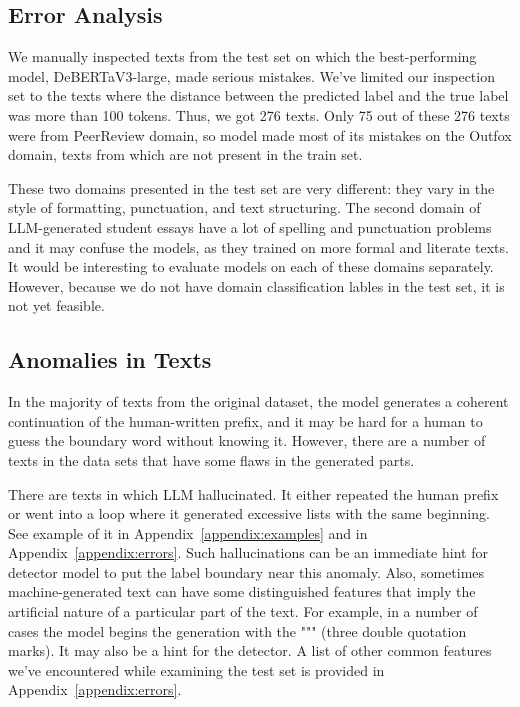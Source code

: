\documentclass[11pt]{article}
\begin{document}
\subsection{Error Analysis}

 We manually inspected texts from the test set on which the best-performing model, DeBERTaV3-large, made serious mistakes. We've limited our inspection set to the texts where the distance between the predicted label and the true label was more than 100 tokens. Thus, we got 276 texts. Only 75 out of these 276 texts were from PeerReview domain, so model made most of its mistakes on the Outfox domain, texts from which are not present in the train set.
 
 These two domains presented in the test set are very different: they vary in the style of formatting, punctuation, and text structuring. The second domain of LLM-generated student essays have a lot of spelling and punctuation problems and it may confuse the models, as they trained on more formal and literate texts. It would be interesting to evaluate models on each of these domains separately. However, because we do not have domain classification lables in the test set, it is not yet feasible.


\subsection{Anomalies in Texts}

In the majority of texts from the original dataset, the model generates a coherent continuation of the human-written prefix, and it may be hard for a human to guess the boundary word without knowing it. However, there are a number of texts in the data sets that have some flaws in the generated parts.

There are texts in which LLM hallucinated. It either repeated the human prefix or went into a loop where it generated excessive lists with the same beginning. See example of it in Appendix~\ref{appendix:examples} and in Appendix~\ref{appendix:errors}. Such hallucinations can be an immediate hint for detector model to put the label boundary near this anomaly.
Also, sometimes machine-generated text can have some distinguished features that imply the artificial nature of a particular part of the text. For example, in a number of cases the model begins the generation with the """ (three double quotation marks). It may also be a hint for the detector.
A list of other common features we've encountered while examining the test set is provided in Appendix~\ref{appendix:errors}. 
\end{document}
